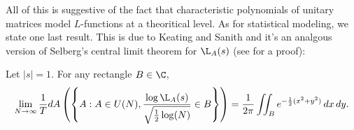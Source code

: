       All of this is suggestive of the fact that characteristic polynomials of unitary matrices model $L$-functions at a theoritical level. As for statistical modeling, we state one last result. This is due to Keating and Sanith and it's an analgous version of Selberg's central limit theorem for $\L_{A}(s)$ (see  for a proof):

      \begin{theorem}
        Let $|s| = 1$. For any rectangle $B \in \C$,
        \[
          \lim_{N \to \infty}\frac{1}{T}dA\left(\left\{A:A \in U(N),\frac{\log\L_{A}(s)}{\sqrt{\frac{1}{2}\log(N)}} \in B\right\}\right) = \frac{1}{2\pi}\iint_{B}e^{-\frac{1}{2}(x^{2}+y^{2})}\,dx\,dy.
        \]
      \end{theorem}
\fi